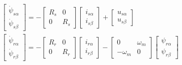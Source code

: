 \documentclass[11pt,a4paper,oneside]{book}
\numberwithin{equation}{section}
\theoremstyle{it}
\theoremstyle{definition}
\begin{document}
\begin{equation} \label{im_eq_20}
	\begin{aligned}
		&\left[
		\begin{matrix}
			\dot{\psi}_{s\alpha} \\[6pt]
			\dot{\psi}_{s\beta}
		\end{matrix} \right] = -
		\left[
		\begin{matrix}
			R_s & 0 \\[6pt]
			0 & R_s 
		\end{matrix} \right]
		\left[
		\begin{matrix}
			i_{s\alpha} \\[6pt]
			i_{s\beta}
		\end{matrix} \right] +
		\left[
		\begin{matrix}
			u_{s\alpha} \\[6pt]
			u_{s\beta}
		\end{matrix}
		\right] \\[6pt]
		&\left[
		\begin{matrix}
			\dot{\psi}_{r\alpha} \\[6pt]
			\dot{\psi}_{r\beta}
		\end{matrix} \right] = -
		\left[
		\begin{matrix}
			R_r & 0 \\[6pt]
			0 & R_r
		\end{matrix} \right]
		\left[
		\begin{matrix}
			i_{r\alpha} \\[6pt]
			i_{r\beta}
		\end{matrix} \right] - 
		\left[
		\begin{matrix}
			0 & \omega_m \\[6pt]
			- \omega_m & 0
		\end{matrix} \right]
		\left[
		\begin{matrix}
			{\psi}_{r\alpha} \\[6pt]
			{\psi}_{r\beta}
		\end{matrix} \right]
	\end{aligned}
\end{equation}
\end{document}
